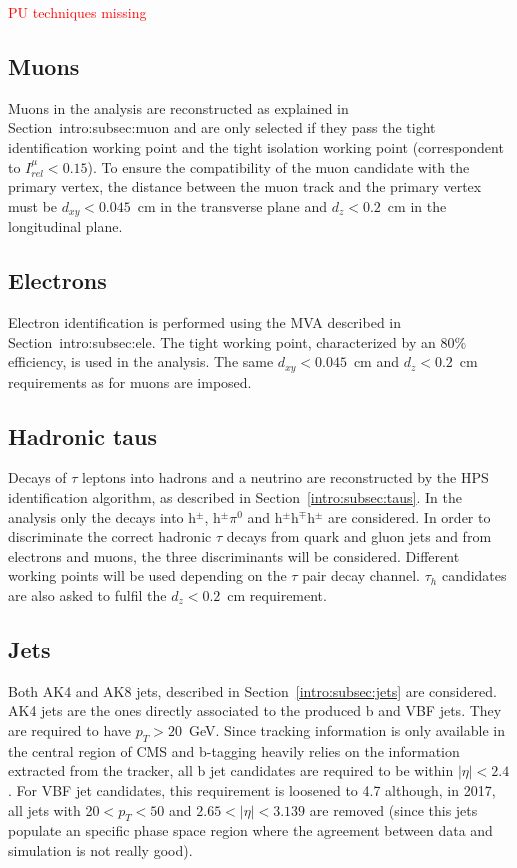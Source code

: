 \documentclass[../main.tex]{subfiles}
\begin{document}
\textcolor{red}{PU techniques missing}

\subsection{Muons}
\label{hh:subs:muons}

Muons in the analysis are reconstructed as explained in Section~{intro:subsec:muon} and are only selected if they pass the tight identification working point and the tight isolation working point (correspondent to $I^\mu_{rel}<0.15$). To ensure the compatibility of the muon candidate with the primary vertex, the distance between the muon track and the primary vertex must be $d_{xy}<0.045$~cm in the transverse plane and $d_z<0.2$~cm in the longitudinal plane.

\subsection{Electrons}
\label{hh:subs:electrons}

Electron identification is performed using the MVA described in Section~{intro:subsec:ele}. The tight working point, characterized by an 80$\%$ efficiency, is used in the analysis. The same $d_{xy}<0.045$~cm and $d_z<0.2$~cm requirements as for muons are imposed.

\subsection{Hadronic taus}
\label{hh:subs:taus}

Decays of $\tau$ leptons into hadrons and a neutrino are reconstructed by the HPS identification algorithm, as described in Section~\ref{intro:subsec:taus}. In the analysis only the decays into h${}^\pm$,  h${}^\pm \pi^0$ and h${}^\pm$h${}^\mp$h${}^\pm$ are considered. In order to discriminate the correct hadronic $\tau$ decays from quark and gluon jets and from electrons and muons, the three \deeptau{} discriminants will be considered. Different working points will be used depending on the $\tau$ pair decay channel. $\tau_h$ candidates are also asked to fulfil the $d_z<0.2$~cm requirement.


\subsection{Jets}
\label{hh:subs:jets}

Both AK4 and AK8 jets, described in Section~\ref{intro:subsec:jets} are considered. AK4 jets are the ones directly associated to the produced b and VBF jets. They are required to have $p_T > 20$~GeV. Since tracking information is only available in the central region of CMS and b-tagging heavily relies on the information extracted from the tracker, all b jet candidates are required to be within $|\eta|<2.4$. For VBF jet candidates, this requirement is loosened to 4.7 although, in 2017, all jets with 20$<p_T<50$ and $2.65<|\eta|<3.139$ are removed (since this jets populate an specific phase space region where the agreement between data and simulation is not really good).
\end{document}

